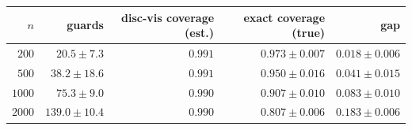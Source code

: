 \begin{tabular}{rrrrr}
  \toprule
  $n$ & guards & disc-vis coverage (est.) & exact coverage (true) & gap \\
  \midrule
  $200$  & $20.5 \pm 7.3$  & $0.991$ & $0.973 \pm 0.007$ & $0.018 \pm 0.006$ \\
  $500$  & $38.2 \pm 18.6$ & $0.991$ & $0.950 \pm 0.016$ & $0.041 \pm 0.015$ \\
  $1000$ & $75.3 \pm 9.0$  & $0.990$ & $0.907 \pm 0.010$ & $0.083 \pm 0.010$ \\
  $2000$ & $139.0 \pm 10.4$ & $0.990$ & $0.807 \pm 0.006$ & $0.183 \pm 0.006$ \\
  \bottomrule
\end{tabular}
